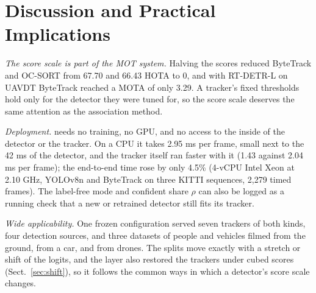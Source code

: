 \section{Discussion and Practical Implications}\label{sec:discussion}

\emph{The score scale is part of the MOT system.} Halving the scores reduced ByteTrack and OC-SORT
from 67.70 and 66.43 HOTA to 0, and with RT-DETR-L on UAVDT ByteTrack reached a MOTA of only 3.29.
A tracker's fixed thresholds hold only for the detector they were tuned for, so the score scale
deserves the same attention as the association method.

\emph{Deployment.} \scl{} needs no training, no GPU, and no access to the inside of the detector or
the tracker. On a CPU it takes 2.95 ms per frame, small next to the 42 ms of the detector, and the
tracker itself ran faster with it (1.43 against 2.04 ms per frame); the end-to-end time rose by
only 4.5\% (4-vCPU Intel Xeon at 2.10 GHz, YOLOv8n and ByteTrack on three KITTI sequences, 2,279
timed frames). The label-free mode and confident share $\rho$ can also be logged as a running check
that a new or retrained detector still fits its tracker.

\emph{Wide applicability.} One frozen configuration served seven trackers of both kinds, four
detection sources, and three datasets of people and vehicles filmed from the ground, from a car,
and from drones. The splits move exactly with a stretch or shift of the logits, and the layer also
restored the trackers under cubed scores (Sect.~\ref{sec:shift}), so it follows the common ways in
which a detector's score scale changes.
